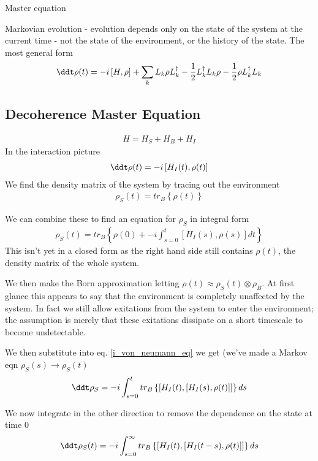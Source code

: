 Master equation

Markovian evolution - evolution depends only on the state of the system at the current time - not the state of the environment, or the history of the state. The most general form \cite{lindblad}
\begin{align}
  \ddt \rho(t) = -i \left[H, \rho\right] + \sum_k L_k \rho L_k^\dagger -\frac{1}{2} L_k^\dagger L_k \rho -\frac{1}{2} \rho L_k^\dagger L_k 
\end{align}


\subsection{Decoherence Master Equation}

\begin{align}
  H = H_S + H_B + H_I
\end{align}
In the interaction picture
\begin{align}
  \label{i_von_neumann_eq}
  \ddt \rho(t) = -i\left[ H_I(t), \rho(t) \right]
\end{align}
We find the density matrix of the system by tracing out the environment
\begin{align}
  \rho_S(t) = tr_B\left\{\rho(t)\right\}
\end{align}

We can combine these to find an equation for $\rho_S$ in integral form
\begin{align}
  \rho_S(t) = tr_B\left\{\rho(0) + -i\int_{s=0}^t \left[ H_I(s), \rho(s) \right] dt \right\}
\end{align}
This isn't yet in a closed form as the right hand side still contains $\rho(t)$, the density matrix of the whole system.

We then make the Born approximation letting $\rho(t) \approx \rho_S(t) \otimes \rho_B$. At first glance this appears to say that the environment is completely unaffected by the system. In fact we still allow exitations from the system to enter the environment; the assumption is merely that these exitations dissipate on a short timescale to become undetectable.

We then substitute into eq. \ref{i_von_neumann_eq} we get (we've made a Markov eqn $\rho_S(s) \rightarrow \rho_S(t)$
\begin{align}
  \ddt \rho_S = -i \int_{s=0}^t tr_B\left\{\left[ H_I(t), \left[ H_I(s), \rho(t) \right] \right]\right\} ds
\end{align}

We now integrate in the other direction to remove the dependence on the state at time $0$
\begin{align}
  \ddt \rho_S(t) = -i \int_{s=0}^\infty tr_B\left\{\left[ H_I(t), \left[ H_I(t-s), \rho(t) \right] \right]\right\} ds
\end{align}

